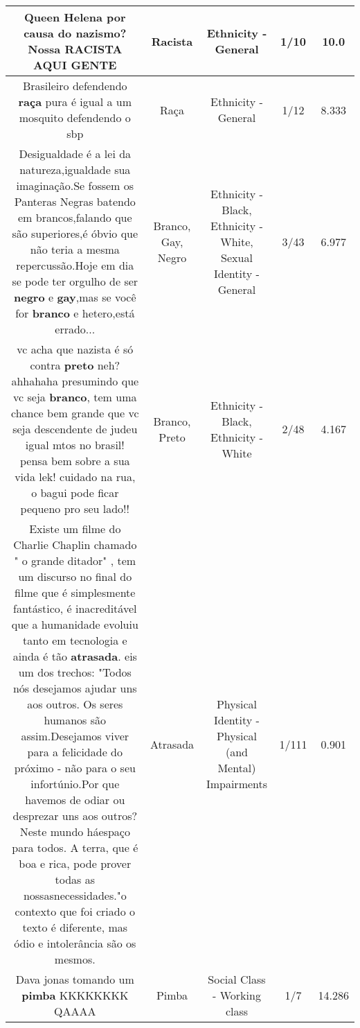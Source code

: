 \documentclass[11pt]{article}
\newlength\mylength
\begin{document}
\begin{center}
\begin{longtable}{|C{.65\mylength}|C{.30\mylength}|C{.12\mylength}|C{.12\mylength}|C{.12\mylength}|}
  \small Queen Helena por causa do nazismo? Nossa \textbf{RACISTA} AQUI GENTE\normalsize   & Racista & Ethnicity - General & 1/10 & 10.0 \\  \hline
  \small Brasileiro defendendo \textbf{raça} pura é igual a um mosquito defendendo o sbp\normalsize   & Raça & Ethnicity - General & 1/12 & 8.333 \\  \hline
  \small Desigualdade é a lei da natureza,igualdade sua imaginação.Se fossem os Panteras Negras batendo em brancos,falando que são superiores,é óbvio que não teria a mesma repercussão.Hoje em dia se pode ter orgulho de ser \textbf{negro} e \textbf{gay},mas se você for \textbf{branco} e hetero,está errado...\normalsize   & Branco, Gay, Negro & Ethnicity - Black, Ethnicity - White, Sexual Identity - General & 3/43 & 6.977 \\  \hline
  \small vc acha que nazista é só contra \textbf{preto} neh? ahhahaha presumindo que vc seja \textbf{branco}, tem uma chance bem grande que vc seja descendente de judeu igual mtos no brasil! pensa bem sobre a sua vida lek! cuidado na rua, o bagui pode ficar pequeno pro seu lado!!\normalsize   & Branco, Preto & Ethnicity - Black, Ethnicity - White & 2/48 & 4.167 \\  \hline
  \small Existe um filme do Charlie Chaplin chamado " o grande  ditador" , tem um discurso no final do filme que é simplesmente fantástico, é inacreditável que a humanidade evoluiu tanto em tecnologia e ainda é tão \textbf{atrasada}. eis um dos trechos: "Todos nós desejamos ajudar uns aos outros. Os seres humanos são assim.Desejamos viver para a felicidade do próximo - não para o seu infortúnio.Por que havemos de odiar ou desprezar uns aos outros? Neste mundo háespaço para todos. A terra, que é boa e rica, pode prover todas as nossasnecessidades."o contexto que foi criado o texto é diferente, mas ódio e intolerância são os mesmos.\normalsize   & Atrasada & Physical Identity - Physical (and Mental) Impairments & 1/111 & 0.901 \\  \hline
  \small Dava jonas tomando um \textbf{pimba} KKKKKKKK QAAAA\normalsize   & Pimba & Social Class - Working class & 1/7 & 14.286 \\  \hline

\end{longtable}
\end{center}
\end{document}
